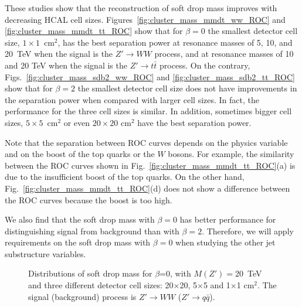 These studies show that the reconstruction of soft drop mass improves with decreasing  HCAL cell sizes.
Figures~\ref{fig:cluster_mass_mmdt_ww_ROC} and 
\ref{fig:cluster_mass_mmdt_tt_ROC} show that for $\beta=0$ the 
smallest detector cell size, 
$1\times1$~cm$^2$, has the best separation power at 
resonance masses of 5, 10, and 20~TeV when the signal is the $Z' \rightarrow WW$ process,  and 
at  resonance masses of 10 and 20 TeV when the signal is the $Z' \rightarrow t\bar{t}$ process.
On the contrary, Figs.~\ref{fig:cluster_mass_sdb2_ww_ROC} and \ref{fig:cluster_mass_sdb2_tt_ROC} 
show that for $\beta=2$ the smallest detector cell size 
does not have improvements in the separation power when compared with 
larger cell sizes. In fact, the performance for the three cell sizes is  
similar. In addition, sometimes bigger cell sizes, 
$5\times5$~cm$^2$ or even $20 \times 20$ cm$^2$ have the best separation power. 

Note that the separation between ROC curves depends 
on the physics variable and on the boost of the top quarks or the $W$ bosons. For example, 
the similarity between the ROC curves shown in Fig.~\ref{fig:cluster_mass_mmdt_tt_ROC}(a)
is due to the insufficient boost of the top quarks.
On the other hand, Fig.~\ref{fig:cluster_mass_mmdt_tt_ROC}(d) does not show a difference 
between the ROC curves because the boost is too high.

We also find that the  soft drop mass with $\beta=0$ has better 
performance for distinguishing signal from background than with  $\beta=2$. Therefore, we will 
apply requirements on the soft drop mass with $\beta=0$  when studying the other jet substructure 
variables. 
 
\begin{figure}
\begin{center}
\end{center}
\caption{Distributions of soft drop mass for $\beta$=0, with $M(Z') = 20$~TeV and three different detector cell sizes: 20$\times$20, 
5$\times$5 and 1$\times$1 cm$^2$. The signal (background) process is 
$Z' \rightarrow WW$ ($Z'\rightarrow q\bar{q}$).
\label{fig:cluster_mass_mmdt_ww}}
\end{figure}


